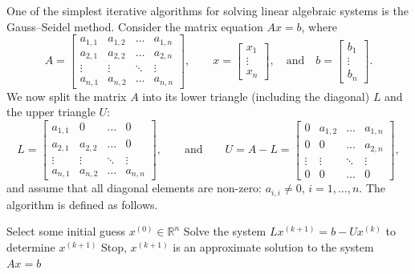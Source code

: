 \documentclass[10pt,a4paper]{article}
\newcommand{\R}{\mathbb{R}}
\theoremstyle{plain}
\theoremstyle{definition}
\begin{document}
One of the simplest iterative algorithms for solving linear algebraic systems is the Gauss--Seidel method.
Consider the matrix equation \(Ax = b\), where
\[
  A =
  \begin{bmatrix}
    a_{1,1} & a_{1,2} & \dots & a_{1,n}\\
    a_{2,1} & a_{2,2} & \dots & a_{2,n}\\
    \vdots  & \vdots & \ddots &\vdots\\
    a_{n,1} & a_{n,2} & \dots & a_{n,n}
  \end{bmatrix},
  \qquad
  x = \begin{bmatrix} x_1\\\vdots \\ x_n\end{bmatrix},
  \quad
  \text{and}
  \quad
  b = \begin{bmatrix} b_1\\\vdots \\ b_n\end{bmatrix}.
\]
We now split the matrix \(A\) into its lower triangle (including the diagonal)
\(L\) and the upper triangle \(U\):
\[
L =
\begin{bmatrix}
  a_{1,1} & 0 & \dots & 0\\
  a_{2,1} & a_{2,2} & \dots & 0\\
  \vdots  & \vdots & \ddots &\vdots\\
  a_{n,1} & a_{n,2} & \dots & a_{n,n}
\end{bmatrix},
\qquad
\text{and}
\qquad
U = A-L =
\begin{bmatrix}
  0 & a_{1,2} & \dots & a_{1,n}\\
  0 & 0 & \dots & a_{2,n}\\
  \vdots  & \vdots & \ddots &\vdots\\
  0 & 0 & \dots & 0
\end{bmatrix},
\]
and assume that all diagonal elements are non-zero: \(a_{i,i}\neq 0\), \(i=1,\dots,n\).
The algorithm is defined as follows.
\begin{algorithmic}[1]
\STATE Select some initial guess \(x^{(0)} \in \R^n\)
  \STATE Solve the system
  \(L x^{(k+1)} = b - Ux^{(k)}\) to determine \(x^{(k+1)}\)
    \STATE Stop, \(x^{(k+1)}\) is an approximate solution
    to the system \(Ax=b\)
  \ENDIF
\ENDFOR
\end{algorithmic}
\end{document}
